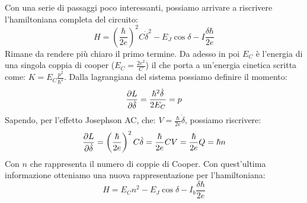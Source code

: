 Con una serie di passaggi poco interessanti, possiamo arrivare a riscrivere l'hamiltoniana completa del circuito:
\begin{equation*}
     H = \left(\frac{\hbar}{2e}\right)^2C{\dot\delta}^2 - E_J \cos{\delta} - I \frac{\delta\hbar}{2e}
\end{equation*}
Rimane da rendere più chiaro il primo termine.
Da adesso in poi $E_C$ è l'energia di una singola coppia di cooper ($E_C = \frac{2e^2}{C}$) il che porta a un'energia cinetica scritta come: $K=E_C \frac{p^2}{\hbar^2}$.
Dalla lagrangiana del sistema possiamo definire il momento:
\begin{equation*}
    \partialderivative{L}{\dot \delta} = \frac{\hbar^2\dot\delta}{2E_C} = p
\end{equation*}
Sapendo, per l'effetto Josephson AC, che: $V = \frac{\hbar}{2e}\dot \delta$, possiamo riscrivere:
\begin{equation*}
    \partialderivative{L}{\dot \delta} = \left(\frac{\hbar}{2e}\right)^2C \dot \delta = \frac{\hbar}{2e}CV = \frac{\hbar}{2e}Q = \hbar n
\end{equation*}
Con $n$ che rappresenta il numero di coppie di Cooper.
Con quest'ultima informazione otteniamo una nuova rappresentazione per l'hamiltoniana:
\begin{equation*}
     H = E_C  n^2 - E_J \cos{\delta} - I_b\frac{\delta\hbar}{2e}
\end{equation*}